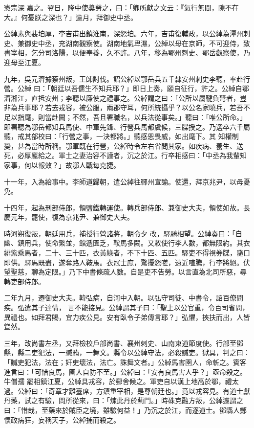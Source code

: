\begin{pinyinscope}
 憲宗深
 嘉之。翌日，降中使獎勞之，曰：「卿所獻之文云：『氣行無間，隙不在大。』何憂朕之深也？」逾月，拜御史中丞。



 公綽素與裴垍厚，李吉甫出鎮淮南，深怨垍。六年，吉甫復輔政，以公綽為潭州刺史、兼御史中丞，充湖南觀察使。湖南地氣卑濕，公綽以母在京師，不可迎侍，致書宰相，乞分司洛陽，以便奉養，久不許。八年，移為鄂州刺史、鄂岳觀察使，乃迎母至江夏。



 九年，吳元濟據蔡州叛，王師討伐。詔公綽以鄂岳兵五千隸安州刺史李聽，率赴行營。公綽
 曰：「朝廷以吾儒生不知兵耶？」即日上奏，願自征行，許之。公綽自鄂濟湘江，直抵安州；李聽以廉使之禮事之。公綽謂之曰：「公所以屬鞬負弩者，豈非為兵事耶？若去戎容，被公服，兩郡守耳，何所統攝乎？以公名家曉兵，若吾不足以指麾，則當赴闕；不然，吾且署職名，以兵法從事矣。」聽曰：「唯公所命。」即署聽為鄂岳都知兵馬使、中軍先鋒、行營兵馬都虞候，三牒授之。乃選卒六千屬聽，戒其部校曰：「行營之事，一決都將。」聽感恩畏威，如出麾下。其
 知權制變，甚為當時所稱。鄂軍既在行營，公綽時令左右省問其家。如疾病、養生、送死，必厚廩給之。軍士之妻治容不謹者，沉之於江。行卒相感曰：「中丞為我輩知家事，何以報效？」故鄂人戰每克捷。



 十一年，入為給事中。李師道歸朝，遣公綽往鄆州宣諭。使還，拜京兆尹，以母憂免。



 十四年，起為刑部侍郎，領鹽鐵轉運使。轉兵部侍郎、兼御史大夫，領使如故。長慶元年，罷使，復為京兆尹、兼御史大夫。



 時河朔復叛，朝廷用兵，補授行營諸將，朝令夕
 改，驛騎相望。公綽奏曰：「自幽、鎮用兵，使命繁並，館遞匱乏，鞍馬多闕。又敕使行李人數，都無限約。其衣緋紫乘馬者，二十、三十匹，衣黃綠者，不下十匹、五匹。驛吏不得視券牒，隨口即供。驛馬既盡，遂奪路人鞍馬。衣冠士庶，驚擾怨嗟，遠近喧騰，行李將絕。伏望聖慈，聊為定限。」乃下中書條疏人數。自是吏不告勞。以言直為北司所惡，尋轉吏部侍郎。



 二年九月，遷御史大夫。韓弘病，自河中入朝。以弘守司徒、中書令，詔百僚問疾。弘遣其子達情，
 言不能接見。公綽謂其子曰：「聖上以公官重，令百司省問，異禮也。如拜君賜，宜力疾公見。安有臥令子弟傳言耶？」弘懼，挾扶而出，人皆聳然。



 三年，改尚書左丞，又拜檢校戶部尚書、襄州刺史、山南東道節度使。行部至鄧縣，縣二吏犯法，一贓賄，一舞文。縣令以公綽守法，必殺贓吏。獄具，判之曰：「贓吏犯法，法在；奸吏壞法，法亡。誅舞文者。」公綽馬害圉人，命斬之。賓客進言曰：「可惜良馬，圉人自防不至。」公綽曰：「安有良馬害人乎？」亟命殺之。牛僧孺
 罷相鎮江夏，公綽具戎容，於郵舍候之。軍吏自以漢上地高於鄂，禮太過。公綽曰：「奇章才離臺席，方鎮重宰相，是尊朝廷也。」竟以戎容見。有道士獻丹藥，試之有驗，問所從來，曰：「煉此丹於薊門。」時硃克融方叛，公綽遽謂之曰：「惜哉，至藥來於賊臣之境，雖驗何益！」乃沉之於江，而逐道士。鄧縣人鄭懷政病狂，妄稱天子，公綽捕而殺之。




\end{pinyinscope}
